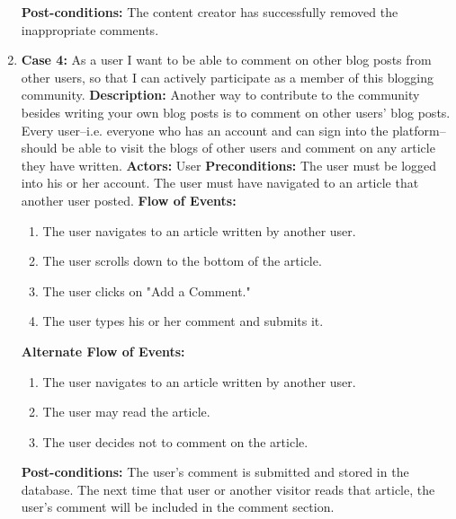\documentclass{article}
\begin{document}
\begin{enumerate}
\begin{enumerate}
    \end{enumerate}
    \textbf{Post-conditions: }The content creator has successfully removed the inappropriate comments.
    \item  \textbf{Case 4: }As a user I want to be able to comment on other blog posts from other users, so that I can actively participate as a member of this blogging community. \newline
\textbf{Description: }Another way to contribute to the community besides writing your own blog posts is to comment on other users' blog posts.  Every user--i.e. everyone who has an account and can sign into the platform--should be able to visit the blogs of other users and comment on any article they have written. \newline
\textbf{Actors: }User \newline
\textbf{Preconditions: } The user must be logged into his or her account.  The user must have navigated to an article that another user posted. \newline
\textbf{Flow of Events: }
\begin{enumerate}
    \item The user navigates to an article written by another user.
    \item The user scrolls down to the bottom of the article.
    \item The user clicks on "Add a Comment."
    \item The user types his or her comment and submits it.
\end{enumerate}
\textbf{Alternate Flow of Events: }
\begin{enumerate}
    \item The user navigates to an article written by another user.
    \item The user may read the article.
    \item The user decides not to comment on the article.
\end{enumerate}
\textbf{Post-conditions: } The user's comment is submitted and stored in the database.  The next time that user or another visitor reads that article, the user's comment will be included in the comment section.


\end{enumerate}
\end{document}
